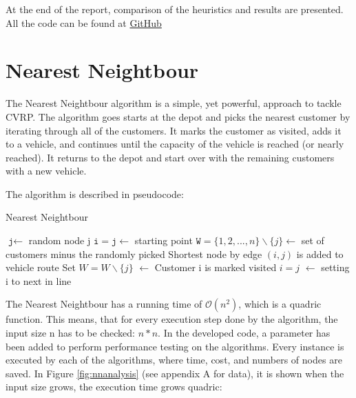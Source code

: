\documentclass[12pt]{article}
\newcommand{\var}{\texttt}
\begin{document}
At the end of the report, comparison of the heuristics and results are presented.
All the code can be found at \href{https://github.com/AlexanderFalk/2020_Project01_CS_HA}{GitHub}
\newpage

\section{Nearest Neightbour} 

The Nearest Neightbour algorithm is a simple, yet powerful, approach to tackle CVRP. The algorithm goes starts at the depot and picks the nearest customer by iterating through all of the customers. It marks the customer as visited, adds it to a vehicle, and continues until the capacity of the vehicle is reached (or nearly reached). It returns to the depot and start over with the remaining customers with a new vehicle. 

The algorithm is described in pseudocode:
\newline

\begin{algorithm}[!ht]
	\caption{Nearest Neightbour}\label{euclid}
	\begin{algorithmic}[1]
	\State $\var{j} \gets$ random node j
	\State $\var{i} = \var{j} \gets$ starting point
	\State $\var{W} = \{1, 2, ..., n\} \backslash \{j\} \gets$ set of customers minus the randomly picked
			\State {}
			\State Shortest node by edge $(i,j)$ is added to vehicle route
			\State Set $W = W \backslash \{j\}$ $\gets$ Customer i is marked visited
			\State $i = j$ $\gets$ setting i to next in line

		\EndWhile
	\EndFunction

	\end{algorithmic}
\end{algorithm}

The Nearest Neightbour has a running time of $\mathcal{O}(n^2)$, which is a quadric function. This means, that for every execution step done by the algorithm, the input size n has to be checked: $ n * n$.  
In the developed code, a parameter has been added to perform performance testing on the algorithms. Every instance is executed by each of the algorithms, where time, cost, and numbers of nodes are saved. In Figure \ref{fig:nnanalysis} (see appendix A for data), it is shown when the input size grows, the execution time grows quadric:
\end{document}
